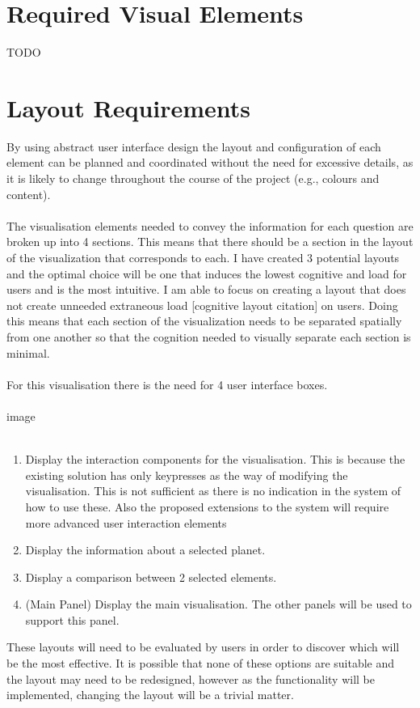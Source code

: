 \documentclass[11pt
              , a4paper
              , twoside
              , openright
              ]{report}
\begin{document}
\section{Required Visual Elements}
TODO
\section{Layout Requirements}
By using abstract user interface design the layout and configuration of each element can be planned and coordinated without the need for excessive details, as it is likely to change throughout the course of the project (e.g., colours and content).
\\\\
The visualisation elements needed to convey the information for each question are broken up into 4 sections. This means that there should be a section in the layout of the visualization that corresponds to each. I have created 3 potential layouts and the optimal choice will be one that induces the lowest cognitive and load for users and is the most intuitive.  I am able to focus on creating a layout that does not create unneeded extraneous load [cognitive layout citation] on users. Doing this means that each section of the visualization needs to be separated spatially from one another so that the cognition needed to visually separate each section is minimal.  
\\\\
For this visualisation there is the need for 4 user interface boxes. 
\\\\
image
\\\\
\begin{enumerate}
 \item Display the interaction components for the visualisation. This is because the existing solution has only keypresses as the way of modifying the visualisation. This is not sufficient as there is no indication in the system of how to use these. Also the proposed extensions to the system will require more advanced user interaction elements
\item Display the information about a selected planet.
\item Display a comparison between 2 selected elements.
\item (Main Panel) Display the main visualisation. The other panels will be used to support this panel.
\end{enumerate}
These layouts will need to be evaluated by users in order to discover which will be the most effective. It is possible that none of these options are suitable and the layout may need to be redesigned, however as the functionality will be implemented, changing the layout will be a trivial matter. 
\end{document}
